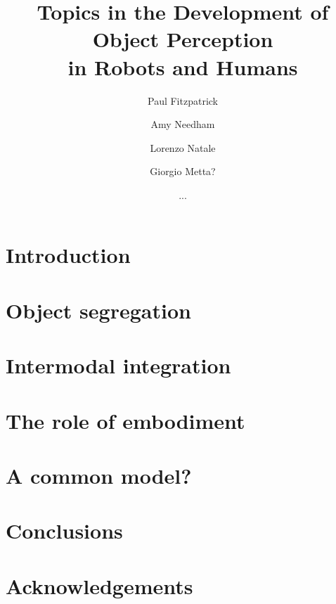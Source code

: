 \documentclass[a4]{epirob}
\title{
Topics in the Development of Object Perception \\ in Robots and Humans
}
\author{Paul Fitzpatrick  \and Amy Needham \and Lorenzo Natale \and
\and Giorgio Metta? \and ...}
\begin{document}
\maketitle


\begin{abstract}

\end{abstract}


\section{Introduction}




\section{Object segregation}




\section{Intermodal integration}






\section{The role of embodiment}



\section{A common model?}




%



\section{Conclusions}




\section*{Acknowledgements}





\nocite{natale05developmental}
\nocite{arsenio05exploiting}





\end{document}

